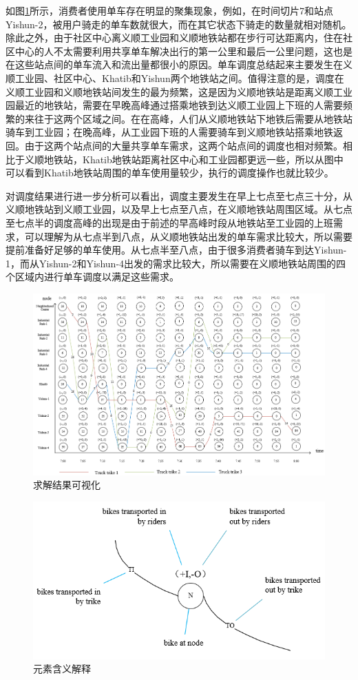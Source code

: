 \documentclass[]{tongjithesis}
\numberwithin{equation}{chapter}
\begin{document}
如图\ref{visualization}所示，消费者使用单车存在明显的聚集现象，例如，在时间切片7和站点Yishun-2，被用户骑走的单车数就很大，而在其它状态下骑走的数量就相对随机。除此之外，由于社区中心离义顺工业园和义顺地铁站都在步行可达距离内，住在社区中心的人不太需要利用共享单车解决出行的第一公里和最后一公里问题，这也是在这些站点间的单车流入和流出量都很小的原因。单车调度总结起来主要发生在义顺工业园、社区中心、Khatib和Yishun两个地铁站之间。值得注意的是，调度在义顺工业园和义顺地铁站间发生的最为频繁，这是因为义顺地铁站是距离义顺工业园最近的地铁站，需要在早晚高峰通过搭乘地铁到达义顺工业园上下班的人需要频繁的来往于这两个区域之间。在在高峰，人们从义顺地铁站下地铁后需要从地铁站骑车到工业园；在晚高峰，从工业园下班的人需要骑车到义顺地铁站搭乘地铁返回。由于这两个站点间的大量共享单车需求，这两个站点间的调度也相对频繁。相比于义顺地铁站，Khatib地铁站距离社区中心和工业园都更远一些，所以从图中可以看到Khatib地铁站周围的单车使用量较少，执行的调度操作也就比较少。

对调度结果进行进一步分析可以看出，调度主要发生在早上七点至七点三十分，从义顺地铁站到义顺工业园，以及早上七点至八点，在义顺地铁站周围区域。从七点至七点半的调度高峰的出现是由于前述的早高峰时段从地铁站至工业园的上班需求，可以理解为从七点半到八点，从义顺地铁站出发的单车需求比较大，所以需要提前准备好足够的单车使用。从七点半至八点，由于很多消费者骑车到达Yishun-1，而从Yishun-2和Yishun-4出发的需求比较大，所以需要在义顺地铁站周围的四个区域内进行单车调度以满足这些需求。

\begin{figure}[H]
    \centering
    \includegraphics[width=1.0 \textwidth]{figures_main/visualiza_solution_trike.png}
    \caption{求解结果可视化}
    \label{visualization}
\end{figure}

\begin{figure}[H]
    \centering
    \includegraphics[width=0.6 \textwidth]{figures_main/element_illustration.png}
    \caption{元素含义解释}
    \label{element_illus}
\end{figure}
\end{document}
